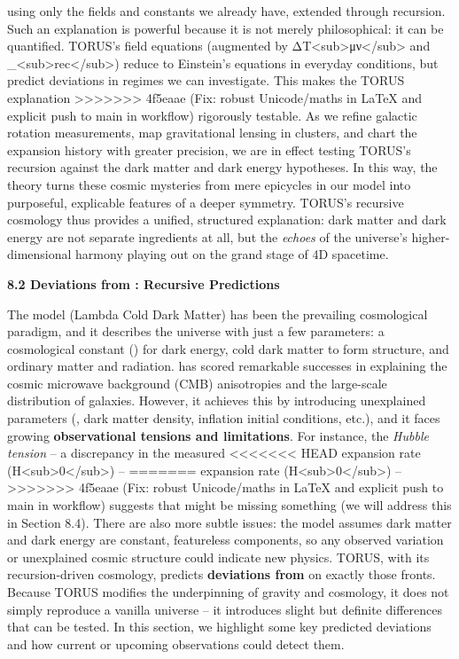 \documentclass[]{article}
\begin{document}
using only the fields and constants we already have, extended through
recursion. Such an explanation is powerful because it is not merely
philosophical: it can be quantified. TORUS's field equations (augmented
by ΔT\textless{}sub\textgreater{}μν\textless{}/sub\textgreater{} and
\Lambda\_\textless{}sub\textgreater{}rec\textless{}/sub\textgreater{}) reduce
to Einstein's equations in everyday conditions, but predict deviations
in regimes we can investigate​. This makes the TORUS explanation
>>>>>>> 4f5eaae (Fix: robust Unicode/maths in LaTeX and explicit push to main in workflow)
rigorously testable. As we refine galactic rotation measurements, map
gravitational lensing in clusters, and chart the expansion history with
greater precision, we are in effect testing TORUS's recursion against
the dark matter and dark energy hypotheses. In this way, the theory
turns these cosmic mysteries from mere epicycles in our model into
purposeful, explicable features of a deeper symmetry. TORUS's recursive
cosmology thus provides a unified, structured explanation: dark matter
and dark energy are not separate ingredients at all, but the
\emph{echoes} of the universe's higher-dimensional harmony playing out
on the grand stage of 4D spacetime.

\textbf{8.2 Deviations from : Recursive Predictions}

The  model (Lambda Cold Dark Matter) has been the prevailing
cosmological paradigm, and it describes the universe with just a few
parameters: a cosmological constant (\Lambda) for dark energy, cold dark
matter to form structure, and ordinary matter and radiation.  has
scored remarkable successes in explaining the cosmic microwave
background (CMB) anisotropies and the large-scale distribution of
galaxies. However, it achieves this by introducing unexplained
parameters (\Lambda, dark matter density, inflation initial conditions, etc.),
and it faces growing \textbf{observational tensions and limitations}.
For instance, the \emph{Hubble tension} -- a discrepancy in the measured
<<<<<<< HEAD
expansion rate (H\textless sub\textgreater0\textless/sub\textgreater) --
=======
expansion rate
(H\textless{}sub\textgreater{}0\textless{}/sub\textgreater{}) --
>>>>>>> 4f5eaae (Fix: robust Unicode/maths in LaTeX and explicit push to main in workflow)
suggests that  might be missing something (we will address this in
Section 8.4). There are also more subtle issues: the model assumes dark
matter and dark energy are constant, featureless components, so any
observed variation or unexplained cosmic structure could indicate new
physics. TORUS, with its recursion-driven cosmology, predicts
\textbf{deviations from } on exactly those fronts. Because TORUS
modifies the underpinning of gravity and cosmology, it does not simply
reproduce a vanilla  universe -- it introduces slight but definite
differences that can be tested. In this section, we highlight some key
predicted deviations and how current or upcoming observations could
detect them.
\end{document}
